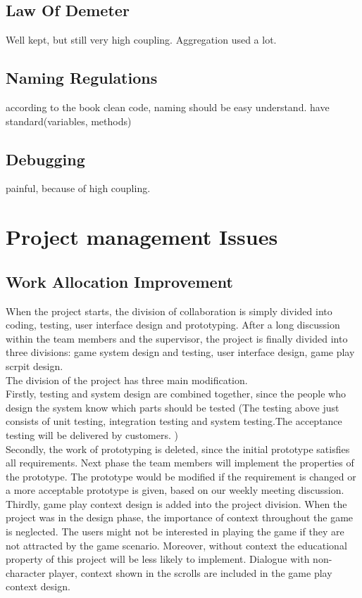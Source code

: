 \documentclass[12pt, a4paper]{report}
\begin{document}
		\subsection {Law Of Demeter}
			Well kept, but still very high coupling. Aggregation used a lot.\\
		\subsection {Naming Regulations}
			according to the book clean code, naming should be easy understand. have standard(variables, methods)
		\subsection {Debugging}
			painful, because of high coupling.
	\section{Project management Issues}
		\subsection{Work Allocation Improvement}
		When the project starts, the division of collaboration is simply divided into coding, testing, user interface design and prototyping. After a long discussion within the team members and the supervisor, the project is finally divided into three divisions: game system design and testing, user interface design, game play scrpit design. \\


		The division of the project has three main modification.\\

		Firstly, testing and system design are combined together, since the people who design the system know which parts should be tested (The testing above just consists of unit testing, integration testing and system testing.The acceptance testing will be delivered by customers. )\\

		Secondly, the work of prototyping is deleted, since the initial prototype satisfies all requirements. Next phase the team members will implement the properties of the prototype. The prototype would be modified if the requirement is changed or a more acceptable prototype is
		given, based on our weekly meeting discussion.\\

		Thirdly, game play context design is added into the project division. When the project was in the design phase, the importance of context throughout the game is neglected. The users might not be interested in playing the game if they are not attracted by the game scenario. Moreover, without context the educational property of this project will be less likely to implement. Dialogue with non-character player, context shown in the scrolls are included in the game play context design.\\ 
\end{document}
